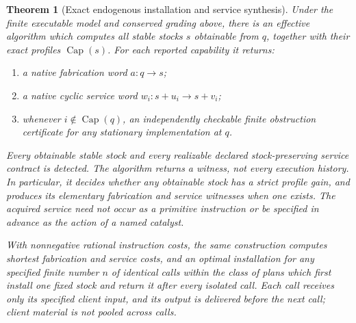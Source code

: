 \documentclass[11pt]{article}
\newtheorem{theorem}{Theorem}[section]
\theoremstyle{definition}
\theoremstyle{remark}
\begin{document}
\begin{theorem}[Exact endogenous installation and service synthesis]\label{er:thm:synthesis}
Under the finite executable model and conserved grading above, there is an effective algorithm which computes all stable stocks $s$ obtainable from $q$, together with their exact profiles $\operatorname{Cap}(s)$. For each reported capability it returns:
\begin{enumerate}
\item a native fabrication word $a:q\to s$;
\item a native cyclic service word $w_i:s+u_i\to s+v_i$;
\item whenever $i\notin\operatorname{Cap}(q)$, an independently checkable finite obstruction certificate for any stationary implementation at $q$.
\end{enumerate}
Every obtainable stable stock and every realizable declared stock-preserving service contract is detected. The algorithm returns a witness, not every execution history. In particular, it decides whether any obtainable stock has a strict profile gain, and produces its elementary fabrication and service witnesses when one exists. The acquired service need not occur as a primitive instruction or be specified in advance as the action of a named catalyst.

With nonnegative rational instruction costs, the same construction computes shortest fabrication and service costs, and an optimal installation for any specified finite number $n$ of identical calls within the class of plans which first install one fixed stock and return it after every isolated call. Each call receives only its specified client input, and its output is delivered before the next call; client material is not pooled across calls.
\end{theorem}
\end{document}
